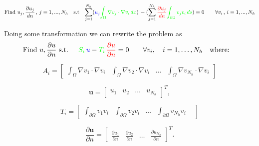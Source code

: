 \documentclass[11pt,onecolumn]{article}
\begin{document}
\begin{equation}
\begin{aligned}
&\text{Find } u_j,\frac{\partial u_j}{dn}  \,,\, j = 1,...,N_h\quad \text{s.t}
&\sum_{j=1}^{N_h} ({\color{blue} u_j}  {\color{green}\int_{\Omega} \nabla v_j \cdot \nabla v_i\, dx})    \, - (\sum_{j=1}^{N_h} {\color{red}\frac{\partial u_j}{dn} }{\color{green}\int_{\partial\Omega}v_jv_i\,ds}) = 0
\qquad \forall v_i \,,\, i = 1,...,N_h
\end{aligned}
\end{equation}


Doing some transformation we can rewrite the problem as
\begin{equation}
\begin{aligned}
\text{Find } u,\frac{\partial u}{\partial n} \text{ s.t. } \quad
&{\color{green} S_i}\, {\color{blue} u} 
- 
{\color{green} T_i}\,
{\color{red} \frac{\partial u}{\partial n}} 
= 0 \qquad \forall v_i, \quad i = 1, \dots, N_h \quad \text{where:}
\end{aligned}
\label{eq:discrete_formulation_4}
\end{equation} 

\begin{equation}
A_i 
= 
\begin{bmatrix}
\int_{\Omega}\nabla v_1 \cdot \nabla v_i &
\int_{\Omega}\nabla v_2 \cdot \nabla v_i &
\dots &
\int_{\Omega}\nabla v_{N_h} \cdot \nabla v_i
\end{bmatrix}
\end{equation}


\begin{equation}
\mathbf{u} = 
\begin{bmatrix}
u_1 & u_2 & \dots & u_{N_h}
\end{bmatrix}^T,
\end{equation}

\begin{equation}
T_i =
\begin{bmatrix}
\int_{\partial\Omega}v_1 v_i &
\int_{\partial\Omega}v_2 v_i &
\dots &
\int_{\partial\Omega}v_{N_h} v_i &
\end{bmatrix}
\end{equation}



\begin{equation}
\frac{\partial \mathbf{u}}{\partial n} =
\begin{bmatrix}
\frac{\partial u_1}{\partial n} &
\frac{\partial u_2}{\partial n} &
\dots &
\frac{\partial u_{N_h}}{\partial n}
\end{bmatrix}^T.
\end{equation}
\end{document}
